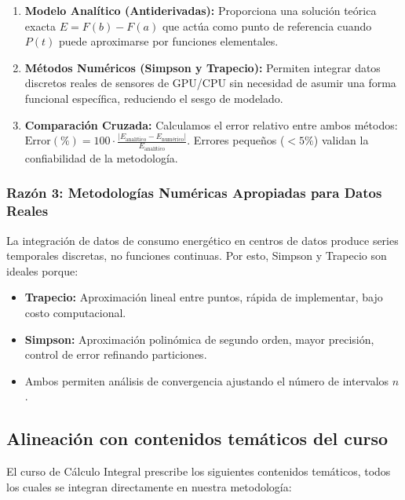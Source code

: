 \begin{enumerate}
    \item \textbf{Modelo Analítico (Antiderivadas):} Proporciona una solución teórica exacta $E = F(b) - F(a)$ que actúa como punto de referencia cuando $P(t)$ puede aproximarse por funciones elementales.
    
    \item \textbf{Métodos Numéricos (Simpson y Trapecio):} Permiten integrar datos discretos reales de sensores de GPU/CPU sin necesidad de asumir una forma funcional específica, reduciendo el sesgo de modelado.
    
    \item \textbf{Comparación Cruzada:} Calculamos el error relativo entre ambos métodos: $\text{Error}(\%) = 100 \cdot \frac{|E_{\text{analítico}} - E_{\text{numérico}}|}{E_{\text{analítico}}}$. Errores pequeños ($< 5\%$) validan la confiabilidad de la metodología.
\end{enumerate}

\subsubsection*{Razón 3: Metodologías Numéricas Apropiadas para Datos Reales}

La integración de datos de consumo energético en centros de datos produce series temporales discretas, no funciones continuas. Por esto, Simpson y Trapecio son ideales porque:

\begin{itemize}
    \item \textbf{Trapecio:} Aproximación lineal entre puntos, rápida de implementar, bajo costo computacional.
    \item \textbf{Simpson:} Aproximación polinómica de segundo orden, mayor precisión, control de error refinando particiones.
    \item Ambos permiten análisis de convergencia ajustando el número de intervalos $n$.
\end{itemize}

\subsection{Alineación con contenidos temáticos del curso}

El curso de Cálculo Integral prescribe los siguientes contenidos temáticos, todos los cuales se integran directamente en nuestra metodología:


